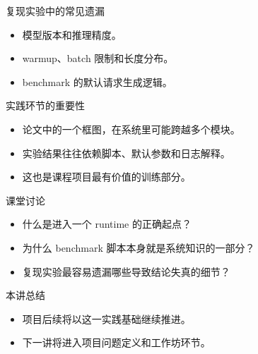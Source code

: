 \begin{frame}{复现实验中的常见遗漏}
  \begin{itemize}
    \item 模型版本和推理精度。
    \item warmup、batch 限制和长度分布。
    \item benchmark 的默认请求生成逻辑。
  \end{itemize}
\end{frame}

\begin{frame}{实践环节的重要性}
  \begin{itemize}
    \item 论文中的一个框图，在系统里可能跨越多个模块。
    \item 实验结果往往依赖脚本、默认参数和日志解释。
    \item 这也是课程项目最有价值的训练部分。
  \end{itemize}
\end{frame}



\begin{frame}{课堂讨论}
  \begin{itemize}
    \item 什么是进入一个 runtime 的正确起点？
    \item 为什么 benchmark 脚本本身就是系统知识的一部分？
    \item 复现实验最容易遗漏哪些导致结论失真的细节？
  \end{itemize}
\end{frame}

\begin{frame}{本讲总结}
  \begin{itemize}
    \item 项目后续将以这一实践基础继续推进。
    \item 下一讲将进入项目问题定义和工作坊环节。
  \end{itemize}
\end{frame}

